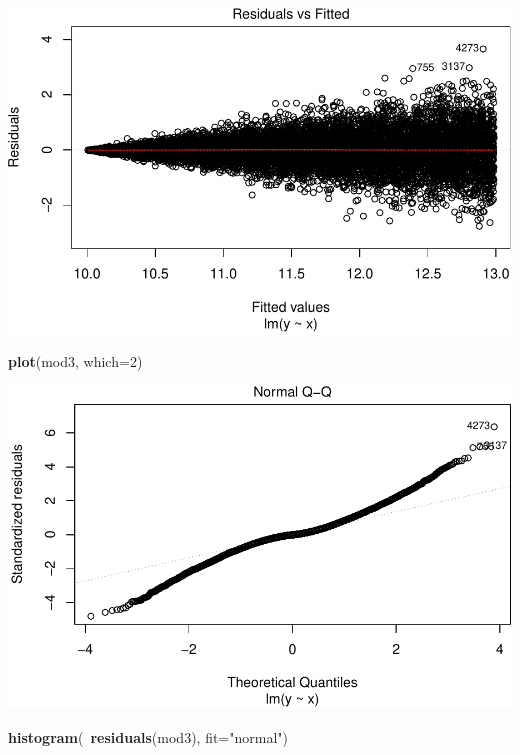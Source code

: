 \documentclass[]{article}
\newenvironment{Shaded}{\begin{snugshade}}{\end{snugshade}}
\newcommand{\KeywordTok}[1]{\textcolor[rgb]{0.13,0.29,0.53}{\textbf{{#1}}}}
\newcommand{\DataTypeTok}[1]{\textcolor[rgb]{0.13,0.29,0.53}{{#1}}}
\newcommand{\DecValTok}[1]{\textcolor[rgb]{0.00,0.00,0.81}{{#1}}}
\newcommand{\StringTok}[1]{\textcolor[rgb]{0.31,0.60,0.02}{{#1}}}
\newcommand{\NormalTok}[1]{{#1}}
\begin{document}
\includegraphics{02_lab_residuals_files/figure-latex/unnamed-chunk-15-2.pdf}

\begin{Shaded}
\begin{Highlighting}[]
\KeywordTok{plot}\NormalTok{(mod3, }\DataTypeTok{which=}\DecValTok{2}\NormalTok{)}
\end{Highlighting}
\end{Shaded}

\includegraphics{02_lab_residuals_files/figure-latex/unnamed-chunk-15-3.pdf}

\begin{Shaded}
\begin{Highlighting}[]
\KeywordTok{histogram}\NormalTok{(~}\KeywordTok{residuals}\NormalTok{(mod3), }\DataTypeTok{fit=}\StringTok{"normal"}\NormalTok{)}
\end{Highlighting}
\end{Shaded}
\end{document}
